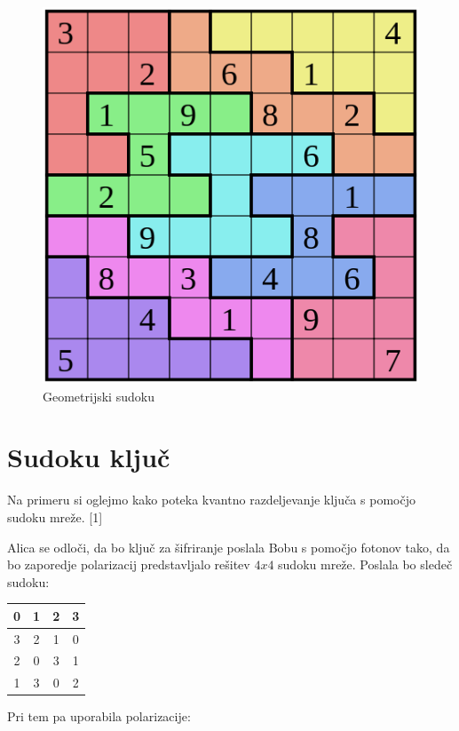 \documentclass[A4paper, 11pt]{article}
\begin{document}
\begin{figure}[h]
\centering
\caption{Geometrijski sudoku}
\includegraphics[scale=0.4]{geo_sudoku}
\end{figure}


\section{Sudoku ključ}

Na primeru si oglejmo kako poteka kvantno razdeljevanje ključa s pomočjo sudoku mreže. [1]

Alica se odloči, da bo ključ za šifriranje poslala Bobu s pomočjo fotonov tako, da bo zaporedje polarizacij predstavljalo rešitev $4x4$ sudoku mreže. Poslala bo sledeč sudoku:

\begin{center}
\begin{tabular}{| c | c || c | c |}
\hline
0 & 1 & 2 & 3\\
\hline
3 & 2 & 1 & 0\\
\hline
\hline
2 & 0 & 3 & 1\\
\hline
1 & 3 & 0 & 2\\
\hline
\end{tabular}
\end{center}

Pri tem pa uporabila polarizacije:
\end{document}
